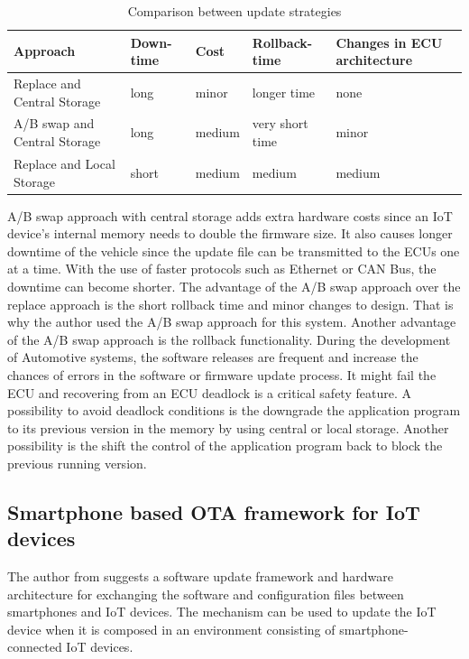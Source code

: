 \documentclass[12pt,a4paper]{article}
\begin{document}
\begin{table}
\centering
\begin{tabular}{ |p{3cm}||p{2cm}|p{2cm}|p{2cm}| p{2cm}|}
 \hline
 Approach &  Down-time& Cost & Rollback-time & Changes in ECU architecture \\
 \hline
 Replace and Central Storage & long & minor & longer time & none \\
 \hline
 A/B swap and Central Storage & long & medium & very short time & minor \\
 \hline
 Replace and Local Storage & short & medium & medium & medium \\
 \hline
\end{tabular}
\caption{ Comparison between update strategies \cite{r28}}
\label{update_approach_comparison}
\end{table}

A/B swap approach with central storage adds extra hardware costs since an IoT device's internal memory needs to double the firmware size. It also causes longer downtime of the vehicle since the update file can be transmitted to the ECUs one at a time. With the use of faster protocols such as Ethernet or CAN Bus, the downtime can become shorter. The advantage of the A/B swap approach over the replace approach is the short rollback time and minor changes to design. That is why the author used the A/B swap approach for this system. Another advantage of the A/B swap approach is the rollback functionality. During the development of Automotive systems, the software releases are frequent and increase the chances of errors in the software or firmware update process. It might fail the ECU and recovering from an ECU deadlock is a critical safety feature. A possibility to avoid deadlock conditions is the downgrade the application program to its previous version in the memory by using central or local storage. Another possibility is the shift the control of the application program back to block the previous running version. \cite{r28}


\subsection{Smartphone based OTA framework for IoT devices}

The author from \cite{r29} suggests a software update framework and hardware architecture for exchanging the software and configuration files between smartphones and IoT devices. The mechanism can be used to update the IoT device when it is composed in an environment consisting of smartphone-connected IoT devices. \cite{r29} \\
\end{document}
